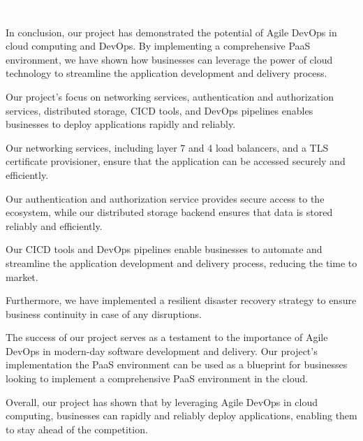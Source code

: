 \fancyhead[R]{\ungaramond\small\textbf{}}
\textcolor{white}{I} %

\begin{center}

\end{center}
In conclusion, our project has demonstrated the potential of Agile DevOps in cloud computing and DevOps. By implementing a comprehensive PaaS environment, we have shown how businesses can leverage the power of cloud technology to streamline the application development and delivery process. 

Our project's focus on networking services, authentication and authorization services, distributed storage, CICD tools, and DevOps pipelines enables businesses to deploy applications rapidly and reliably. 

Our networking services, including layer 7 and 4 load balancers, and a TLS certificate provisioner, ensure that the application can be accessed securely and efficiently. 

Our authentication and authorization service provides secure access to the ecosystem, while our distributed storage backend ensures that data is stored reliably and efficiently. 

Our CICD tools and DevOps pipelines enable businesses to automate and streamline the application development and delivery process, reducing the time to market. 

Furthermore, we have implemented a resilient disaster recovery strategy to ensure business continuity in case of any disruptions. 

The success of our project serves as a testament to the importance of Agile DevOps in modern-day software development and delivery. Our project's implementation the PaaS environment can be used as a blueprint for businesses looking to implement a comprehensive PaaS environment in the cloud. 

Overall, our project has shown that by leveraging Agile DevOps in cloud computing, businesses can rapidly and reliably deploy applications, enabling them to stay ahead of the competition. 